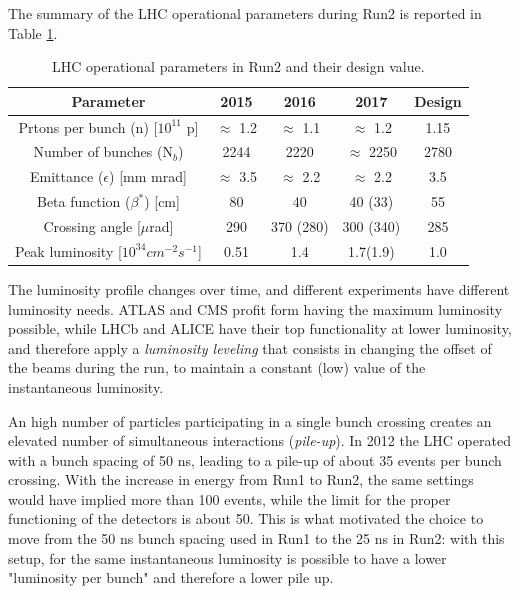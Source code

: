 The summary of the LHC operational parameters during Run2 is reported in Table \ref{tab:lhc:param}.


\begin{table}[ht]
\begin{center}
\begin{tabular}{c c c c c }
\hline 
Parameter & 2015 & 2016 & 2017 & Design \\ 
\hline 
\hline
Prtons per bunch (n) [$10^{11}$ p] & $\approx$ 1.2 & $\approx$ 1.1 & $\approx$ 1.2 & 1.15 \\ 
\hline 
Number of bunches (N$_b$) & 2244 & 2220 & $\approx$ 2250 & 2780 \\ 
\hline 
Emittance ($\epsilon$) [mm mrad] & $\approx$ 3.5 & $\approx$ 2.2 & $\approx$ 2.2 & 3.5 \\ 
\hline 
Beta function ($\beta^*$) [cm] & 80 & 40 & 40 (33) & 55 \\
\hline
Crossing angle [$\mu$rad] & 290 & 370 (280) & 300 (340) & 285 \\
\hline
Peak luminosity [$10^{34} cm^{-2}s^{-1}$] & 0.51 & 1.4 & 1.7(1.9) & 1.0 \\
\hline
\end{tabular}
\end{center}
\caption{LHC operational parameters in Run2 and their design value.}
\label{tab:lhc:param}
\end{table}


The luminosity profile changes over time, and different experiments have different luminosity needs. ATLAS and CMS profit form having the maximum luminosity possible, while LHCb and ALICE have their top functionality at lower luminosity, and therefore apply a \textit{luminosity leveling} that consists in changing the offset of the beams during the run, to maintain a constant (low) value of the instantaneous luminosity.

An high number of particles participating in a single bunch crossing creates an elevated number of simultaneous interactions (\textit{pile-up}). In 2012 the LHC operated with a bunch spacing of 50 ns, leading to a pile-up of about 35 events per bunch crossing. With the increase in energy from Run1 to Run2, the same settings would have implied more than 100 events, while the limit for the proper functioning of the detectors is about 50. This is what motivated the choice to move from the 50 ns bunch spacing used in Run1 to the 25 ns in Run2: with this setup, for the same instantaneous luminosity is possible to have a lower "luminosity per bunch" and therefore a lower pile up.


